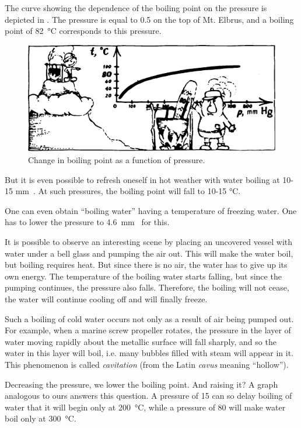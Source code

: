 The curve showing the dependence of the boiling point on the pressure is depicted in . The pressure is equal to  \SI{0.5}{\atmos} on the top of Mt. Elbrus, and a boiling point of \SI{82}{\celsius} corresponds to this pressure.

\begin{figure}[!ht]
\centering
\includegraphics[width=\textwidth]{figures/fig-04-02.pdf}
\caption{Change in boiling point as a function of pressure.}
\label{fig-4.2}
\end{figure}

But it is even possible to refresh oneself in hot weather with water boiling at 10-15 \si{\milli\meter\mercury}. At such pressures, the boiling point will fall to 10-15 \si{\celsius}.

One can even obtain ``boiling water'' having a temper­ature of freezing water. One has to lower the pressure to \SI{4.6}{\milli\meter\mercury} for this.

It is possible to observe an interesting scene by placing an uncovered vessel with water under a bell glass and pumping the air out. This will make the water boil, but boiling requires heat. But since there is no air, the water has to give up its own energy. The temperature of the boiling water starts falling, but since the pumping con­tinues, the pressure also falls. Therefore, the boiling will not cease, the water will continue cooling off and will finally freeze.

Such a boiling of cold water occurs not only as a result of air being pumped out. For example, when a marine screw propeller rotates, the pressure in the layer of water moving rapidly about the metallic surface will fall sharp­ly, and so the water in this layer will boil, i.e. many bubbles filled with steam will appear in it. This phe­nomenon is called \emph{cavitation} (from the Latin \emph{cavus} meaning ``hollow'').

Decreasing the pressure, we lower the boiling point. And raising it? A graph analogous to ours answers this question. A pressure of \SI{15}{\atmos} can so delay boiling of water that it will begin only at \SI{200}{\celsius}, while a pressure of \SI{80}{\atmos} will make water boil only at \SI{300}{\celsius}.

